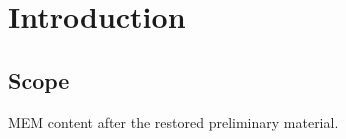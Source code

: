 \documentclass[TFG,MEM,EN,no-cover,no-toc]{P3CTeX}
\begin{document}
\pxTFGcoverdetails
\pxTFGfrontmatter
\chapter{Introduction}
\section{Scope}
MEM content after the restored preliminary material.
\end{document}
